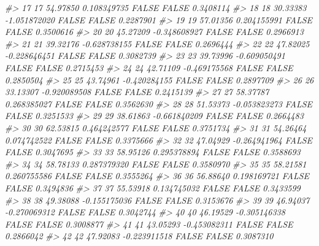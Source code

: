 \documentclass[
  oneside]{book}
\newenvironment{Shaded}{\begin{snugshade}}{\end{snugshade}}
\newcommand{\CommentTok}[1]{\textcolor[rgb]{0.56,0.35,0.01}{\textit{#1}}}
\begin{document}
\begin{Shaded}
\begin{Highlighting}[]
\CommentTok{\#\textgreater{} 17   17  54.97850  0.108349735     FALSE       FALSE        0.3408114}
\CommentTok{\#\textgreater{} 18   18  30.33383 {-}1.051872020     FALSE       FALSE        0.2287901}
\CommentTok{\#\textgreater{} 19   19  57.01356  0.204155991     FALSE       FALSE        0.3500616}
\CommentTok{\#\textgreater{} 20   20  45.27209 {-}0.348608927     FALSE       FALSE        0.2966913}
\CommentTok{\#\textgreater{} 21   21  39.32176 {-}0.628738155     FALSE       FALSE        0.2696444}
\CommentTok{\#\textgreater{} 22   22  47.82025 {-}0.228646451     FALSE       FALSE        0.3082739}
\CommentTok{\#\textgreater{} 23   23  39.73996 {-}0.609050491     FALSE       FALSE        0.2715453}
\CommentTok{\#\textgreater{} 24   24  42.71109 {-}0.469175568     FALSE       FALSE        0.2850504}
\CommentTok{\#\textgreater{} 25   25  43.74961 {-}0.420284155     FALSE       FALSE        0.2897709}
\CommentTok{\#\textgreater{} 26   26  33.13307 {-}0.920089508     FALSE       FALSE        0.2415139}
\CommentTok{\#\textgreater{} 27   27  58.37787  0.268385027     FALSE       FALSE        0.3562630}
\CommentTok{\#\textgreater{} 28   28  51.53373 {-}0.053823273     FALSE       FALSE        0.3251533}
\CommentTok{\#\textgreater{} 29   29  38.61863 {-}0.661840209     FALSE       FALSE        0.2664483}
\CommentTok{\#\textgreater{} 30   30  62.53815  0.464242577     FALSE       FALSE        0.3751734}
\CommentTok{\#\textgreater{} 31   31  54.26464  0.074742522     FALSE       FALSE        0.3375666}
\CommentTok{\#\textgreater{} 32   32  47.04929 {-}0.264941964     FALSE       FALSE        0.3047695}
\CommentTok{\#\textgreater{} 33   33  58.95126  0.295378894     FALSE       FALSE        0.3588693}
\CommentTok{\#\textgreater{} 34   34  58.78133  0.287379320     FALSE       FALSE        0.3580970}
\CommentTok{\#\textgreater{} 35   35  58.21581  0.260755586     FALSE       FALSE        0.3555264}
\CommentTok{\#\textgreater{} 36   36  56.88640  0.198169721     FALSE       FALSE        0.3494836}
\CommentTok{\#\textgreater{} 37   37  55.53918  0.134745032     FALSE       FALSE        0.3433599}
\CommentTok{\#\textgreater{} 38   38  49.38088 {-}0.155175036     FALSE       FALSE        0.3153676}
\CommentTok{\#\textgreater{} 39   39  46.94037 {-}0.270069312     FALSE       FALSE        0.3042744}
\CommentTok{\#\textgreater{} 40   40  46.19529 {-}0.305146338     FALSE       FALSE        0.3008877}
\CommentTok{\#\textgreater{} 41   41  43.05293 {-}0.453082311     FALSE       FALSE        0.2866042}
\CommentTok{\#\textgreater{} 42   42  47.92083 {-}0.223911518     FALSE       FALSE        0.3087310}

\end{Highlighting}
\end{Shaded}
\end{document}
